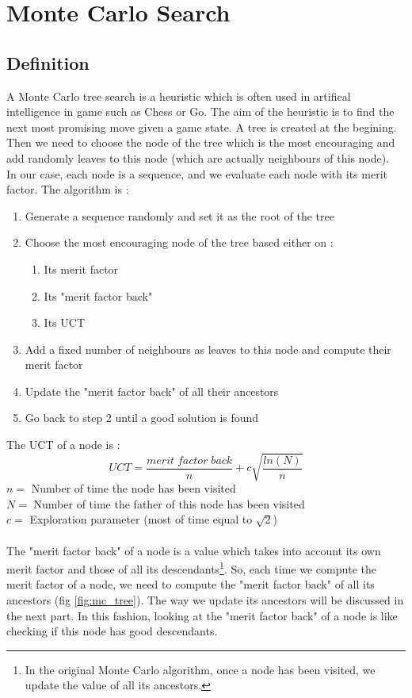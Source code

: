 \documentclass[a4paper,11pt,openany]{article}
\begin{document}
\section{Monte Carlo Search}
\subsection{Definition}
\noindent
A Monte Carlo tree search \cite{mc} is a heuristic which is often used in artifical intelligence in game such as Chess or Go. The aim of the heuristic is to find the next most promising move given a game state. A tree is created at the begining. Then we need to choose the node of the tree which is the most encouraging and add randomly leaves to this node (which are actually neighbours of this node).\\
In our case, each node is a sequence, and we evaluate each node with its merit factor. The algorithm is :
\begin{enumerate}
\item Generate a sequence randomly and set it as the root of the tree
\item Choose the most encouraging node of the tree based either on :
\begin{enumerate}
\item Its merit factor
\item Its "merit factor back"
\item Its UCT
\end{enumerate}
\item Add a fixed number of neighbours as leaves to this node and compute their merit factor
\item Update the "merit factor back" of all their ancestors
\item Go back to step 2 until a good solution is found
\end{enumerate}
The UCT of a node is :
\begin{equation}
UCT=\frac{merit\;factor\;back}{n}+c\sqrt{\frac{ln(N)}{n}}
\end{equation}
$n=$ Number of time the node has been visited\\
$N=$ Number of time the father of this node has been visited\\
$c=$ Exploration parameter (most of time equal to $\sqrt{2}$)\\\\
The "merit factor back" of a node is a value which takes into account its own merit factor and those of all its descendants\footnote{In the original Monte Carlo algorithm, once a node has been visited, we update the value of all its ancestors.}. So, each time we compute the merit factor of a node, we need to compute the "merit factor back" of all its ancestors (fig \ref{fig:mc_tree}). The way we update its ancestors will be discussed in the next part. In this fashion, looking at the "merit factor back" of a node is like checking if this node has good descendants. 
\end{document}
